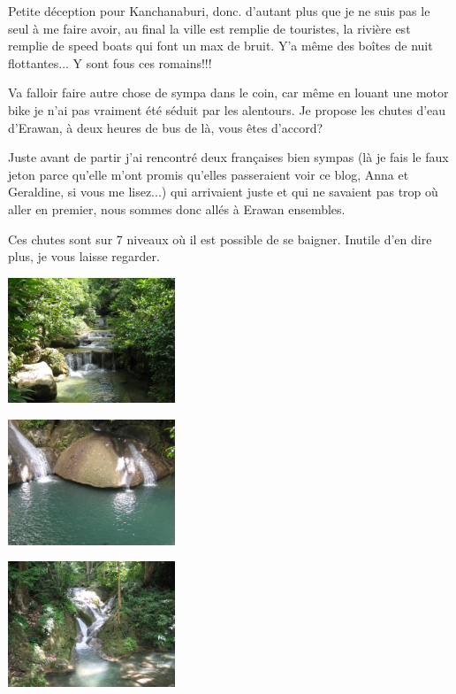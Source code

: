 \begin{multicols}{2}
Petite déception pour Kanchanaburi, donc. d'autant plus que je ne suis pas le seul à me faire avoir, au final la ville est remplie de touristes, la rivière est remplie de speed boats qui font un max de bruit. Y'a même des boîtes de nuit flottantes... Y sont fous ces romains!!!

Va falloir faire autre chose de sympa dans le coin, car même en louant une motor bike je n'ai pas vraiment été séduit par les alentours. Je propose les chutes d'eau d'Erawan, à deux heures de bus de là, vous êtes d'accord?

Juste avant de partir j'ai rencontré deux françaises bien sympas (là je fais le faux jeton parce qu'elle m'ont promis qu'elles passeraient voir ce blog, Anna et Geraldine, si vous me lisez...) qui arrivaient juste et qui ne savaient pas trop où aller en premier, nous sommes donc allés à Erawan ensembles.

Ces chutes sont sur 7 niveaux où il est possible de se baigner. Inutile d'en dire plus, je vous laisse regarder.

\smallbreak
\hspace*{-0.65cm}
\includegraphics[width=5cm]{articles/Kanchanaburi/1440.jpg}
\smallbreak

\smallbreak
\hspace*{-0.65cm}
\includegraphics[width=5cm]{articles/Kanchanaburi/1439.jpg}
\smallbreak

\smallbreak
\hspace*{-0.65cm}
\includegraphics[width=5cm]{articles/Kanchanaburi/1437.jpg}
\smallbreak


\end{multicols}
